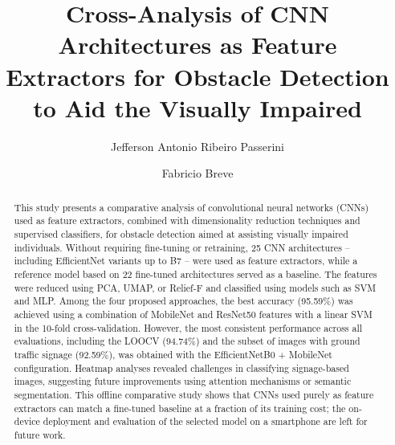 \documentclass[preprint,12pt]{elsarticle}
\begin{document}
\begin{frontmatter}



\title{Cross-Analysis of CNN Architectures as Feature Extractors for Obstacle Detection to Aid the Visually Impaired}


\author{Jefferson Antonio Ribeiro Passerini}
\author{Fabricio Breve}
\address{Institute of Geosciences and Exact Sciences,
	S\~{a}o Paulo State University (UNESP), Rio Claro, SP, 13506-900, Brazil}
	
\begin{abstract}
	This study presents a comparative analysis of convolutional neural networks (CNNs) used as feature extractors, combined with dimensionality reduction techniques and supervised classifiers, for obstacle detection aimed at assisting visually impaired individuals. Without requiring fine-tuning or retraining, 25 CNN architectures -- including EfficientNet variants up to B7 -- were used as feature extractors, while a reference model based on 22 fine-tuned architectures served as a baseline. The features were reduced using PCA, UMAP, or Relief-F and classified using models such as SVM and MLP. Among the four proposed approaches, the best accuracy (95.59\%) was achieved using a combination of MobileNet and ResNet50 features with a linear SVM in the 10-fold cross-validation. However, the most consistent performance across all evaluations, including the LOOCV (94.74\%) and the subset of images with ground traffic signage (92.59\%), was obtained with the EfficientNetB0 + MobileNet configuration. Heatmap analyses revealed challenges in classifying signage-based images, suggesting future improvements using attention mechanisms or semantic segmentation. This offline comparative study shows that CNNs used purely as feature extractors can match a fine-tuned baseline at a fraction of its training cost; the on-device deployment and evaluation of the selected model on a smartphone are left for future work.
\end{abstract}


\end{frontmatter}
\end{document}
